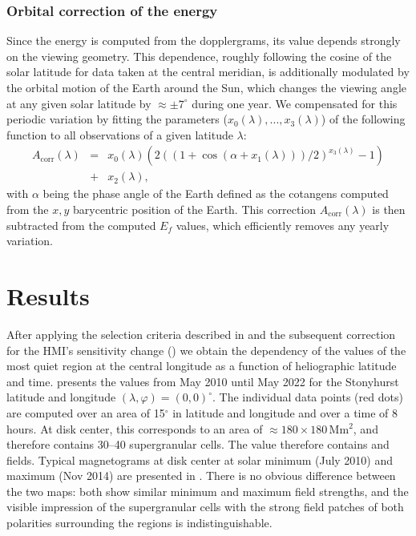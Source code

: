\documentclass{aa}
\begin{document}
\subsubsection*{Orbital correction of the \fff{} 
energy}

Since the \fff
energy
is computed from the \los{} dopplergrams, its value depends strongly on the viewing geometry. This dependence,  roughly following the cosine of the solar latitude for data taken at the central meridian, is additionally modulated by the orbital motion of the Earth around the Sun, which changes the viewing angle at any given solar latitude by $\approx\pm7^\circ$ during one year. We compensated for this periodic variation by fitting the parameters ($x_0(\lambda), ..., x_3(\lambda)$) of the following function to all observations of a given latitude $\lambda$:
\begin{eqnarray}
\label{eq:orbitcorr}
A_{\mbox{corr}}(\lambda) &=& x_0(\lambda) (  2 ( (1+\cos(\alpha+x_1(\lambda)))/2)^{x_3(\lambda)}-1   )\nonumber \\
&+&x_2(\lambda),
\end{eqnarray}
with $\alpha$ being the phase angle of the Earth defined as the cotangens computed from the $x,y$ barycentric position of the Earth.
This correction $A_{\mbox{corr}}(\lambda)$ is then subtracted from the computed 
$E_f$ values, which efficiently removes any yearly variation. 

\section{Results}\label{results}

After applying the selection criteria described in  and the subsequent correction for the 
HMI's
sensitivity change () we obtain the dependency of the \brms{} values of the most quiet region at the central longitude as a function of heliographic latitude and time.  presents the \brms{} values from May 2010 until May 2022 for the 
Stonyhurst latitude and longitude $(\lambda,\varphi) = (0,0)^\circ$.
The individual data points (red dots) are computed over an area of 15$^\circ$ in latitude and longitude and over a time of 8 hours. At disk center, this corresponds to an area of $\approx 180 \times 180$\,Mm$^2$, and therefore contains 30--40 supergranular cells. The \brms{} value 
therefore contains
\NW{} and \IN{} fields.
Typical magnetograms at disk center at solar minimum (July 2010) and maximum (Nov 2014) are presented in . There is no obvious difference between the two maps: both show similar minimum and maximum field strengths, and the visible impression of the supergranular cells with the strong field patches of both polarities surrounding the \IN{} regions is indistinguishable.
\end{document}
